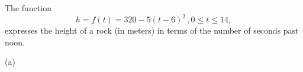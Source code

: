 \documentclass{ximera}
\begin{document}
\begin{example} \label{Ex8:Quadratics}
The function 
\[
   h = f(t) = 320 - 5 (t-6)^2 \, , 0\leq t \leq 14 ,
\]
expresses the height of a rock (in meters) in terms of the number of seconds past noon.

 
\begin{onlineOnly}
    \begin{center}
\end{center}
\end{onlineOnly}

(a) 

\end{example}
\end{document}
